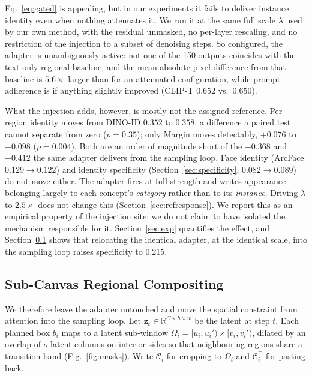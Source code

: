 \documentclass[10pt,twocolumn,letterpaper]{article}
\begin{document}
Eq.~\ref{eq:gated} is appealing, but in our experiments it fails to
deliver instance identity even when nothing attenuates it.  We run it at
the same full scale $\lambda$ used by our own method, with the residual
unmasked, no per-layer rescaling, and no restriction of the injection to
a subset of denoising steps.  So configured, the adapter is
unambiguously active: not one of the 150 outputs coincides with the
text-only regional baseline, and the mean absolute pixel difference from
that baseline is $5.6\times$ larger than for an attenuated
configuration, while prompt adherence is if anything slightly improved
(CLIP-T $0.652$ vs.\ $0.650$).

What the injection adds, however, is mostly not the assigned reference.
Per-region identity moves from DINO-ID $0.352$ to $0.358$, a difference a
paired test cannot separate from zero ($p{=}0.35$); only Margin moves
detectably, $+0.076$ to $+0.098$ ($p{=}0.004$).  Both are an order of
magnitude short of the $+0.368$ and $+0.412$ the same adapter delivers from
the sampling loop.  Face identity (ArcFace $0.129\!\to\!0.122$) and identity
specificity (Section~\ref{sec:specificity}, $0.082\!\to\!0.089$) do not move
either.  The
adapter fires at full strength and writes appearance belonging largely to
each concept's \emph{category} rather than to its \emph{instance}.  Driving
$\lambda$ to $2.5\times$ does not change this
(Section~\ref{sec:refresponse}).  We report
this as an empirical property of the injection site: we do not claim to
have isolated the mechanism responsible for it.
Section~\ref{sec:exp} quantifies the effect, and
Section~\ref{sec:subcanvas} shows that relocating the identical adapter,
at the identical scale, into the sampling loop raises specificity to
$0.215$.

\subsection{Sub-Canvas Regional Compositing}
\label{sec:subcanvas}

We therefore leave the adapter untouched and move the spatial
constraint from attention into the sampling loop.  Let
$\mathbf{z}_t\in\mathbb{R}^{C\times h\times w}$ be the latent at step
$t$.  Each planned box $b_i$ maps to a latent sub-window
$\Omega_i=[u_i,u_i')\times[v_i,v_i')$, dilated by an overlap of $o$
latent columns on interior sides so that neighbouring regions share a
transition band (Fig.~\ref{fig:masks}).  Write $\mathcal{C}_i$ for
cropping to $\Omega_i$ and $\mathcal{C}_i^{\!\top}$ for pasting back.
\end{document}
